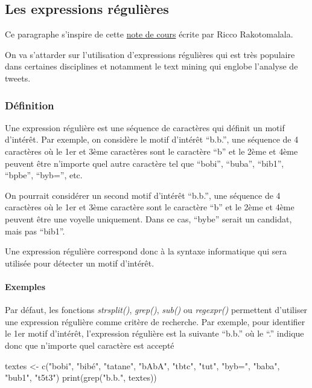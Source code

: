 \documentclass[
]{book}
\newenvironment{Shaded}{\begin{snugshade}}{\end{snugshade}}
\newcommand{\FunctionTok}[1]{\textcolor[rgb]{0.00,0.00,0.00}{#1}}
\newcommand{\NormalTok}[1]{#1}
\newcommand{\OtherTok}[1]{\textcolor[rgb]{0.56,0.35,0.01}{#1}}
\newcommand{\StringTok}[1]{\textcolor[rgb]{0.31,0.60,0.02}{#1}}
\theoremstyle{definition}
\theoremstyle{definition}
\theoremstyle{definition}
\theoremstyle{definition}
\theoremstyle{remark}
\begin{document}
\hypertarget{les-expressions-ruxe9guliuxe8res}{%
\subsection{Les expressions régulières}\label{les-expressions-ruxe9guliuxe8res}}

Ce paragraphe s'inspire de cette \href{http://eric.univ-lyon2.fr/~ricco/cours/slides/TM.E\%20-\%20expressions\%20regulieres.pdf}{note de cours} écrite par Ricco Rakotomalala.

On va s'attarder sur l'utilisation d'expressions régulières qui est très populaire dans certaines disciplines et notamment le text mining qui englobe l'analyse de tweets.

\hypertarget{duxe9finition}{%
\subsubsection{Définition}\label{duxe9finition}}

Une expression régulière est une séquence de caractères qui définit un motif d'intérêt. Par exemple, on considère le motif d'intérêt ``b.b.'', une séquence de 4 caractères où le 1er et 3ème caractères sont le caractère ``b'' et le 2ème et 4ème peuvent être n'importe quel autre caractère tel que ``bobi'', ``buba'', ``bib1'', ``bpbe'', ``byb='', etc.

On pourrait considérer un second motif d'intérêt ``b.b.'', une séquence de 4 caractères où le 1er et 3ème caractère sont le caractère ``b'' et le 2ème et 4ème peuvent être une voyelle uniquement. Dans ce cas, ``bybe'' serait un candidat, mais pas ``bib1''.

Une expression régulière correspond donc à la syntaxe informatique qui sera utilisée pour détecter un motif d'intérêt.

\hypertarget{exemples}{%
\paragraph{Exemples}\label{exemples}}

Par défaut, les fonctions \emph{strsplit()}, \emph{grep()}, \emph{sub()} ou \emph{regexpr()} permettent d'utiliser une expression régulière comme critère de recherche. Par exemple, pour identifier le 1er motif d'intérêt, l'expression régulière est la suivante ``b.b.'' où le ``.'' indique donc que n'importe quel caractère est accepté

\begin{Shaded}
\begin{Highlighting}[]
\NormalTok{textes }\OtherTok{\textless{}{-}} \FunctionTok{c}\NormalTok{(}\StringTok{"bobi"}\NormalTok{, }\StringTok{"bibé"}\NormalTok{, }\StringTok{"tatane"}\NormalTok{, }\StringTok{"bAbA"}\NormalTok{, }\StringTok{"tbtc"}\NormalTok{,}
            \StringTok{"tut"}\NormalTok{, }\StringTok{"byb="}\NormalTok{, }\StringTok{"baba"}\NormalTok{, }\StringTok{"bub1"}\NormalTok{, }\StringTok{"t5t3"}\NormalTok{)}
\FunctionTok{print}\NormalTok{(}\FunctionTok{grep}\NormalTok{(}\StringTok{"b.b."}\NormalTok{, textes))}
\end{Highlighting}
\end{Shaded}
\end{document}
